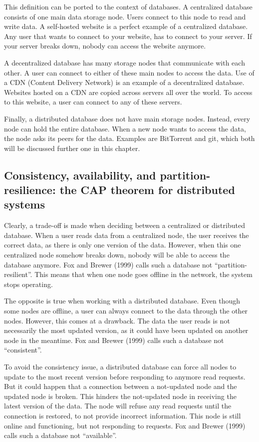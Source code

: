 This definition can be ported to the context of databases. A centralized database consists of one main data storage node. Users connect to this node to read and write data. A self-hosted website is a perfect example of a centralized database. Any user that wants to connect to your website, has to connect to your server. If your server breaks down, nobody can access the website anymore.

A decentralized database has many storage nodes that communicate with each other. A user can connect to either of these main nodes to access the data. Use of a CDN (Content Delivery Network) is an example of a decentralized database. Websites hosted on a CDN are copied across servers all over the world. To access to this website, a user can connect to any of these servers.

Finally, a distributed database does not have main storage nodes. Instead, every node can hold the entire database. When a new node wants to access the data, the node asks its peers for the data. Examples are BitTorrent and git, which both will be discussed further one in this chapter.

\subsection{Consistency, availability, and partition-resilience: the CAP theorem for distributed systems}

Clearly, a trade-off is made when deciding between a centralized or distributed database. When a user reads data from a centralized node, the user receives the correct data, as there is only one version of the data. However, when this one centralized node somehow breaks down, nobody will be able to access the database anymore. Fox and Brewer (1999) \cite{brewers-theorem-paper} calls such a database not ``partition-resilient''. This means that when one node goes offline in the network, the system stops operating.

The opposite is true when working with a distributed database. Even though some nodes are offline, a user can always connect to the data through the other nodes. However, this comes at a drawback. The data the user reads is not necessarily the most updated version, as it could have been updated on another node in the meantime. Fox and Brewer (1999) calls such a database not ``consistent''.

To avoid the consistency issue, a distributed database can force all nodes to update to the most recent version before responding to anymore read requests. But it could happen that a connection between a not-updated node and the updated node is broken. This hinders the not-updated node in receiving the latest version of the data. The node will refuse any read requests until the connection is restored, to not provide incorrect information. This node is still online and functioning, but not responding to requests. Fox and Brewer (1999) calls such a database not ``available''.

